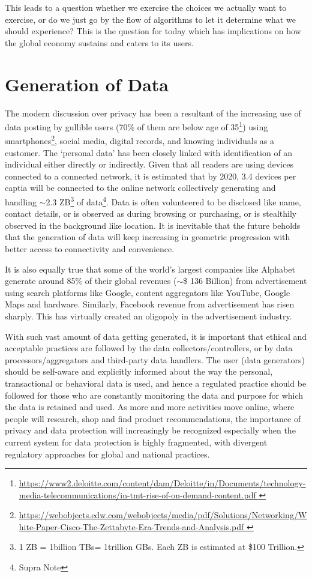 \begin{multicols}{2}
This leads to a question whether we exercise the choices we actually want to exercise, or do we just go by the flow of algorithms to let it determine what we should experience? This is the question for today which has implications on how the global economy sustains and caters to its users.

\section{Generation of Data}

The modern discussion over privacy has been a resultant of the increasing use of data posting by gullible users (70\% of them are below age of 35\footnote{\url{https://www2.deloitte.com/content/dam/Deloitte/in/Documents/technology-media-telecommunications/in-tmt-rise-of-on-demand-content.pdf }}) using smartphones\footnote{\url{https://webobjects.cdw.com/webobjects/media/pdf/Solutions/Networking/White-Paper-Cisco-The-Zettabyte-Era-Trends-and-Analysis.pdf }}, social media, digital records, and knowing individuals as a customer. The ‘personal data’ has been closely linked with identification of an individual either directly or indirectly. Given that all readers are using devices connected to a connected network, it is estimated that by 2020, 3.4 devices per captia will be connected to the online network collectively generating and handling $\sim$2.3 ZB\footnote{1 ZB = 1billion TBs= 1trillion GBs. Each ZB is estimated at \$100 Trillion.} of data\footnote{Supra Note}. Data is often volunteered to be disclosed like name, contact details, or is observed as during browsing or purchasing, or is stealthily observed in the background like location. It is inevitable that the future beholds that the generation of data will keep increasing in geometric progression with better access to connectivity and convenience.

It is also equally true that some of the world's largest companies like Alphabet generate around 85\% of their global revenues ($\sim$\$ 136 Billion) from advertisement using search platforms like Google, content aggregators like YouTube, Google Maps and hardware. Similarly, Facebook revenue from advertisement has risen sharply. This has virtually created an oligopoly in the advertisement industry.

With such vast amount of data getting generated, it is important that ethical and acceptable practices are followed by the data collectors/controllers, or by data processors/aggregators and third-party data handlers. The user (data generators) should be self-aware and explicitly informed about the way the personal, transactional or behavioral data is used, and hence a regulated practice should be followed for those who are constantly monitoring the data and purpose for which the data is retained and used. As more and more activities move online, where people will research, shop and find product recommendations, the importance of privacy and data protection will  increasingly be recognized especially when the current system for data protection is highly fragmented, with divergent regulatory approaches for global and national practices. 


\end{multicols}
